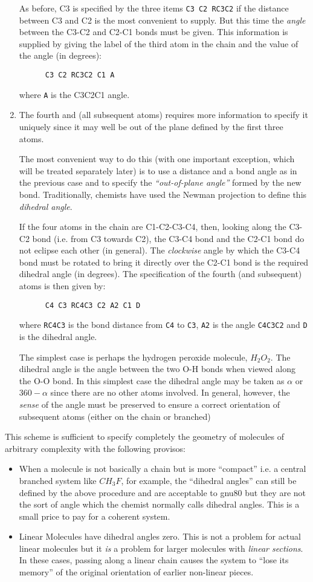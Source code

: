 \begin{enumerate}
As before, C3 is specified by the three items {\tt C3 C2 RC3C2}
if the distance between C3 and C2 is the most convenient to supply.
But this time the {\em angle} between the C3-C2 and C2-C1 bonds must be
given. This information is supplied by giving the label of the
third atom in the chain and the value of the angle (in degrees):
\begin{verbatim}
      C3 C2 RC3C2 C1 A
\end{verbatim}
where {\tt A} is the C3C2C1 angle.
\item The fourth and (all subsequent atoms) requires more information
to specify it uniquely since it may well be out of the plane defined
by the first three atoms. 

The most convenient way to do this (with one important exception, which
will be treated separately later) is to use a distance and a bond angle
as in the previous case and to specify the {\em ``out-of-plane
angle''} formed by the new bond. Traditionally, chemists have used
the Newman projection to define this {\em dihedral angle}.

If the four atoms in the chain are C1-C2-C3-C4, then, looking along
the C3-C2 bond (i.e. from C3 towards C2), the C3-C4 bond and the C2-C1
bond do not eclipse each other (in general). The {\em clockwise}
angle by which the C3-C4 bond must be rotated to bring it directly over the
C2-C1 bond is the required dihedral angle (in degrees). 
The specification of the fourth (and subsequent) atoms is then given
by:
\begin{verbatim}
      C4 C3 RC4C3 C2 A2 C1 D
\end{verbatim}
where {\tt RC4C3} is the bond distance from {\tt C4} to {\tt C3},
{\tt A2} is the angle {\tt C4C3C2} and {\tt D}
is the dihedral angle.

The simplest case is
perhaps the hydrogen peroxide molecule, $H_2 O_2$. The dihedral
angle is the angle between the two O-H bonds when viewed along the O-O
bond. In this simplest case the dihedral angle may be taken as
$\alpha$ or $360 - \alpha$ since there are no other atoms involved.
In general, however, the {\em sense} of the angle must be preserved to
ensure a correct orientation of subsequent atoms (either on the chain
or branched)
\end{enumerate}
This scheme is sufficient to specify completely the geometry
of molecules of arbitrary complexity with the following provisos:
\begin{itemize}
\item When a molecule is not basically a chain but is more
``compact'' i.e. a central branched system like $CH_3F$,
for example, the ``dihedral angles'' can still be defined by
the above procedure and are acceptable to gnu80 but they are not the
sort of angle which the chemist normally calls dihedral angles. This
is a small price to pay for a coherent system.
\item Linear Molecules have dihedral angles zero. This is not a problem
for actual linear molecules but it {\em is} a problem for larger
molecules with {\em linear sections}. In these cases, passing along 
a linear chain causes the system to ``lose its memory''
of the original orientation of earlier non-linear pieces.
\end{itemize}

